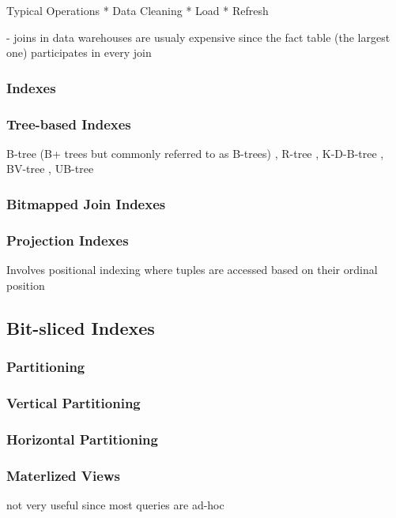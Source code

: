 \documentclass[12pt,a4paper]{article}
\begin{document}
Typical Operations
    * Data Cleaning
    * Load
    * Refresh

- joins in data warehouses are usualy expensive since the fact table (the largest one) participates in every join \cite{628286}

\subsubsection{Indexes}
\subsubsection*{Tree-based Indexes}
B-tree (B+ trees but commonly referred to as B-trees) \cite{253268}, R-tree \cite{602266, Cheung20011}, K-D-B-tree \cite{582321}, BV-tree \cite{223796}, UB-tree \cite{bayer1997universal}

\subsubsection*{Bitmapped Join Indexes}
\cite{212001}


\subsubsection*{Projection Indexes}
Involves positional indexing where tuples are accessed based on their ordinal position \cite{628286}

\subsection*{Bit-sliced Indexes}


\subsubsection{Partitioning}
\cite{thusoo2010data}
\subsubsection*{Vertical Partitioning}

\subsubsection*{Horizontal Partitioning}

\subsubsection{Materlized Views}
not very useful since most queries are ad-hoc \cite{653447}
\cite{355309}
\end{document}
